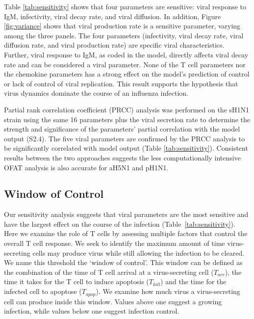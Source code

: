 \documentclass[preprint,10pt,authoryear]{elsarticle}
\begin{document}
Table \ref{tab:sensitivity} shows that four parameters are sensitive: viral response to IgM, infectivity, viral decay rate, and viral diffusion.  In addition, Figure \ref{fig:variance} shows that viral production rate is a sensitive parameter, varying among the three panels.  The four parameters (infectivity, viral decay rate, viral diffusion rate, and viral production rate) are specific viral characteristics.  Further, viral response to IgM, as coded in the model, directly affects viral decay rate and can be considered a viral parameter.  None of the T cell parameters nor the chemokine parameters has a strong effect on the model's prediction of control or lack of control of viral replication.  This result supports the hypothesis that virus dynamics dominate the course of an influenza infection.  

Partial rank correlation coefficient (PRCC) analysis was performed on the sH1N1 strain using the same 16 parameters plus the viral secretion rate to determine the strength and significance of the parameters' partial correlation with the model output (S2.4).  The  five viral parameters are confirmed by the PRCC analysis to be significantly correlated with model output (Table \ref{tab:sensitivity}).  Consistent results between the two approaches suggests the less computationally intensive OFAT analysis is also accurate for aH5N1 and pH1N1.

\subsection*{Window of Control}

Our sensitivity analysis suggests that viral parameters are the most sensitive and have the largest effect on the course of the infection (Table~\ref{tab:sensitivity}).  Here we examine the role of T cells by assessing multiple factors that control the overall T cell response.  We seek to identify the maximum amount of time virus-secreting cells may produce virus while still allowing the infection to be cleared.  We name this threshold the `window of control'.  This window can be defined as the combination of the time of T cell arrival at a virus-secreting cell ($T_{arr}$), the time it takes for the T cell to induce apoptosis ($T_{kill}$) and the time for the infected cell to apoptose ($T_{apop}$).  We examine how much virus a virus-secreting cell can produce inside this window.  Values above one suggest a growing infection, while values below one suggest infection control.
\end{document}
